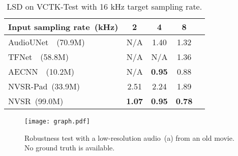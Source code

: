 \documentclass[a4paper]{article}
\begin{document}
\begin{table}[tbp]
\centering
\caption{LSD on VCTK-Test with 16 kHz target sampling rate.}
\label{tab:16k}
\begin{tabular}{@{}lcccc@{}}
\toprule
          Input sampling rate~(kHz)                     & 2   & 4  & 8   \\ \midrule
{ AudioUNet~\cite{audio-supre-resolution-SR-kuleshov2017audio}~(70.9M)} & N/A  & 1.40 &  1.32  \\
{ TFNet~\cite{tf-network-sr-lim2018time}~(58.8M)}    & N/A & N/A   & 1.36   \\
{ AECNN~\cite{heming-towards-sr-wang2021towards}~(10.2M)}    & N/A  & \textbf{0.95} & 0.88   \\
{NVSR-Pad~(33.9M)}                             &  2.51 & 2.24 & 1.89    \\
{NVSR~(99.0M)}                             &  \textbf{1.07} & \textbf{0.95} & \textbf{0.78}   \\ \bottomrule
\end{tabular}
\vspace{-0.6em}
\end{table}

\begin{figure*}[tbp] \centering
\texttt{[image: graph.pdf]}
  \caption{Robustness test with a low-resolution audio~(a) from an old movie\protect\footnotemark. No ground truth is available. }
  \label{fig-tiedaoyoujidui}
\end{figure*}
\end{document}

